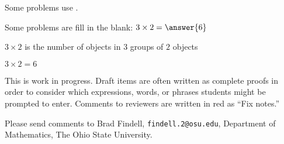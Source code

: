 \documentclass[nooutcomes]{ximera}
\begin{document}
\begin{example}
  Some problems use .
\end{example}

\begin{example}
Some problems are fill in the blank: 
  $3\times 2 = \answer{6}$   
  \begin{hint}
    $3 \times 2$ is the number of objects in $3$ groups of $2$ objects
  \end{hint}
  \begin{hint}
    \begin{image}
    \end{image}
  \end{hint}
  \begin{hint}
    $3\times 2=6$
  \end{hint}
\end{example}


This is work in progress.  Draft items are often written as complete proofs in order to consider which expressions, words, or phrases students might be prompted to enter.  Comments to reviewers are written in red as ``Fix notes.''

Please send comments to Brad Findell, \texttt{findell.2@osu.edu}, Department of Mathematics, The Ohio State University.  
\end{document}
